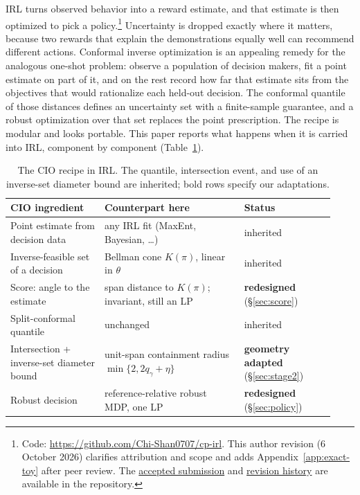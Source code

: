 \documentclass{article}
\begin{document}
IRL turns observed behavior into a reward estimate, and that estimate is then
optimized to pick a policy.\footnote{Code: \url{https://github.com/Chi-Shan0707/cp-irl}.
This author revision (6 October 2026) clarifies attribution and scope and adds
Appendix~\ref{app:exact-toy} after peer review. The
\href{https://github.com/Chi-Shan0707/cp-irl/blob/main/paper/main_full9_revised.pdf}{accepted submission}
and \href{https://github.com/Chi-Shan0707/cp-irl/blob/main/paper/POST_ACCEPTANCE_CHANGES.md}{revision history}
are available in the repository.}
Uncertainty is dropped exactly where it matters,
because two rewards that explain the demonstrations equally well can recommend
different actions. Conformal inverse optimization \citep{lin2024conformal} is
an appealing remedy for the analogous one-shot problem: observe a population of
decision makers, fit a point estimate on part of it, and on the rest record how
far that estimate sits from the objectives that would rationalize each held-out
decision. The conformal quantile of those distances defines an uncertainty set
with a finite-sample guarantee, and a robust optimization over that set replaces
the point prescription. The recipe is modular and looks portable. This paper
reports what happens when it is carried into IRL, component by component
(Table~\ref{tab:recipe}).

\begin{table}[t]
\centering
\small
\caption{The CIO recipe in IRL. The quantile, intersection event, and use of
an inverse-set diameter bound are inherited; bold rows specify our adaptations.}
\label{tab:recipe}
\begin{tabular}{@{}p{0.27\linewidth}p{0.40\linewidth}p{0.26\linewidth}@{}}
\toprule
CIO ingredient & Counterpart here & Status \\
\midrule
Point estimate from decision data & any IRL fit (MaxEnt, Bayesian, \dots) &
inherited \\
Inverse-feasible set of a decision & Bellman cone $K(\pi)$, linear in $\theta$ &
inherited \\
Score: angle to the estimate & span distance to $K(\pi)$; invariant, still an LP
& \textbf{redesigned} (\S\ref{sec:score}) \\
Split-conformal quantile & unchanged & inherited \\
Intersection + inverse-set diameter bound & unit-span containment radius
$\min\{2,2q_\gamma+\eta\}$ & \textbf{geometry adapted}
(\S\ref{sec:stage2}) \\
Robust decision & reference-relative robust MDP, one LP & \textbf{redesigned}
(\S\ref{sec:policy}) \\
\bottomrule
\end{tabular}
\end{table}
\end{document}
